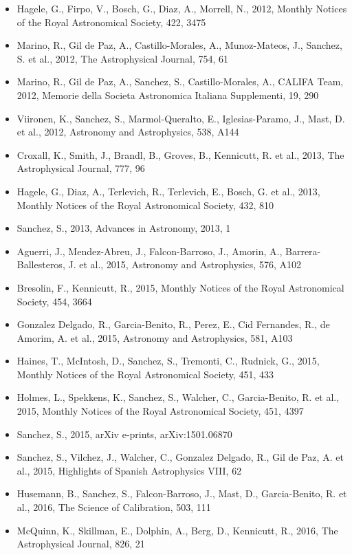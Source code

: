 \documentclass{letter}
\begin{document}
\begin{enumerate}
\begin{itemize}
\item Hagele, G., Firpo, V., Bosch, G., Diaz, A., Morrell, N., 2012, Monthly Notices of the Royal Astronomical Society, 422, 3475
\item Marino, R., Gil de Paz, A., Castillo-Morales, A., Munoz-Mateos, J., Sanchez, S. et al., 2012, The Astrophysical Journal, 754, 61
\item Marino, R., Gil de Paz, A., Sanchez, S., Castillo-Morales, A., CALIFA Team, 2012, Memorie della Societa Astronomica Italiana Supplementi, 19, 290
\item Viironen, K., Sanchez, S., Marmol-Queralto, E., Iglesias-Paramo, J., Mast, D. et al., 2012, Astronomy and Astrophysics, 538, A144
\item Croxall, K., Smith, J., Brandl, B., Groves, B., Kennicutt, R. et al., 2013, The Astrophysical Journal, 777, 96
\item Hagele, G., Diaz, A., Terlevich, R., Terlevich, E., Bosch, G. et al., 2013, Monthly Notices of the Royal Astronomical Society, 432, 810
\item Sanchez, S., 2013, Advances in Astronomy, 2013, 1
\item Aguerri, J., Mendez-Abreu, J., Falcon-Barroso, J., Amorin, A., Barrera-Ballesteros, J. et al., 2015, Astronomy and Astrophysics, 576, A102
\item Bresolin, F., Kennicutt, R., 2015, Monthly Notices of the Royal Astronomical Society, 454, 3664
\item Gonzalez Delgado, R., Garcia-Benito, R., Perez, E., Cid Fernandes, R., de Amorim, A. et al., 2015, Astronomy and Astrophysics, 581, A103
\item Haines, T., McIntosh, D., Sanchez, S., Tremonti, C., Rudnick, G., 2015, Monthly Notices of the Royal Astronomical Society, 451, 433
\item Holmes, L., Spekkens, K., Sanchez, S., Walcher, C., Garcia-Benito, R. et al., 2015, Monthly Notices of the Royal Astronomical Society, 451, 4397
\item Sanchez, S., 2015, arXiv e-prints, arXiv:1501.06870
\item Sanchez, S., Vilchez, J., Walcher, C., Gonzalez Delgado, R., Gil de Paz, A. et al., 2015, Highlights of Spanish Astrophysics VIII, 62
\item Husemann, B., Sanchez, S., Falcon-Barroso, J., Mast, D., Garcia-Benito, R. et al., 2016, The Science of Calibration, 503, 111
\item McQuinn, K., Skillman, E., Dolphin, A., Berg, D., Kennicutt, R., 2016, The Astrophysical Journal, 826, 21

\end{itemize}
\end{enumerate}
\end{document}

